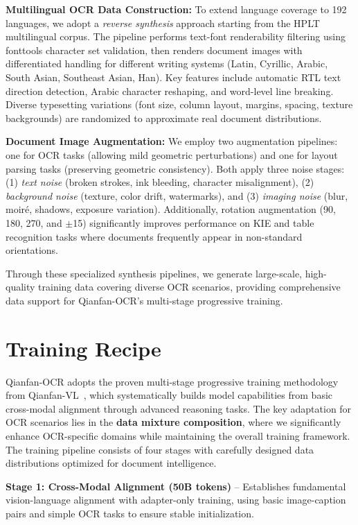 \documentclass[dvipsnames]{article}
\begin{document}
\textbf{Multilingual OCR Data Construction:}
To extend language coverage to 192 languages, we adopt a \textit{reverse synthesis} approach starting from the HPLT multilingual corpus. The pipeline performs text-font renderability filtering using fonttools character set validation, then renders document images with differentiated handling for different writing systems (Latin, Cyrillic, Arabic, South Asian, Southeast Asian, Han). Key features include automatic RTL text direction detection, Arabic character reshaping, and word-level line breaking. Diverse typesetting variations (font size, column layout, margins, spacing, texture backgrounds) are randomized to approximate real document distributions.

\textbf{Document Image Augmentation:}
We employ two augmentation pipelines: one for OCR tasks (allowing mild geometric perturbations) and one for layout parsing tasks (preserving geometric consistency). Both apply three noise stages: (1) \textit{text noise} (broken strokes, ink bleeding, character misalignment), (2) \textit{background noise} (texture, color drift, watermarks), and (3) \textit{imaging noise} (blur, moiré, shadows, exposure variation). Additionally, rotation augmentation (90\textdegree, 180\textdegree, 270\textdegree, and $\pm$15\textdegree) significantly improves performance on KIE and table recognition tasks where documents frequently appear in non-standard orientations.

Through these specialized synthesis pipelines, we generate large-scale, high-quality training data covering diverse OCR scenarios, providing comprehensive data support for Qianfan-OCR's multi-stage progressive training.

\section{Training Recipe}
\label{sec:training}

Qianfan-OCR adopts the proven multi-stage progressive training methodology from Qianfan-VL~\citep{dong2025qianfanvl}, which systematically builds model capabilities from basic cross-modal alignment through advanced reasoning tasks.
The key adaptation for OCR scenarios lies in the \textbf{data mixture composition}, where we significantly enhance OCR-specific domains while maintaining the overall training framework.
The training pipeline consists of four stages with carefully designed data distributions optimized for document intelligence.

\textbf{Stage 1: Cross-Modal Alignment (50B tokens)} -- Establishes fundamental vision-language alignment with adapter-only training, using basic image-caption pairs and simple OCR tasks to ensure stable initialization.
\end{document}
